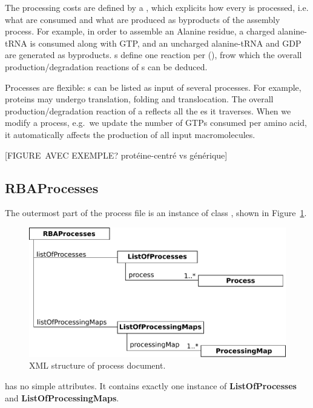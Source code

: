 The processing costs are defined by a \processingmap{},
which explicits how every \component{} is processed, i.e.
what \species{} are consumed and what \species{} are
produced as byproducts of the assembly process.
For example, in order to assemble an Alanine residue,
a charged alanine-tRNA is consumed along with GTP,
and an uncharged alanine-tRNA and GDP are generated as byproducts.
\processingmap{}s define one reaction per \component(), frow which
the overall production/degradation reactions of \macromolecule{}s can be deduced.

Processes are flexible:
\macromolecule{}s can be listed as input of several processes.
For example, proteins may undergo translation, folding and translocation.
The overall production/degradation reaction of a \macromolecule{} reflects
all the \process{}es it traverses.
When we modify a process,
e.g.\ we update the number of GTPs consumed per amino acid,
it automatically affects the production of all input macromolecules.


[FIGURE AVEC EXEMPLE? protéine-centré vs générique]

\subsection{RBAProcesses}
\label{sec:rba_processes}

The outermost part of the process file is an instance of class
\rbaprocesses, shown in Figure~\ref{fig:processes_doc}.

\begin{figure}
  \centering
  \includegraphics[scale=0.8]{figures/processes_doc}
  \caption{XML structure of process document.}
\label{fig:processes_doc}
\end{figure}

\rbaprocesses{} has no simple attributes.
It contains exactly one instance of \textbf{ListOfProcesses}
and \textbf{ListOfProcessingMaps}.


